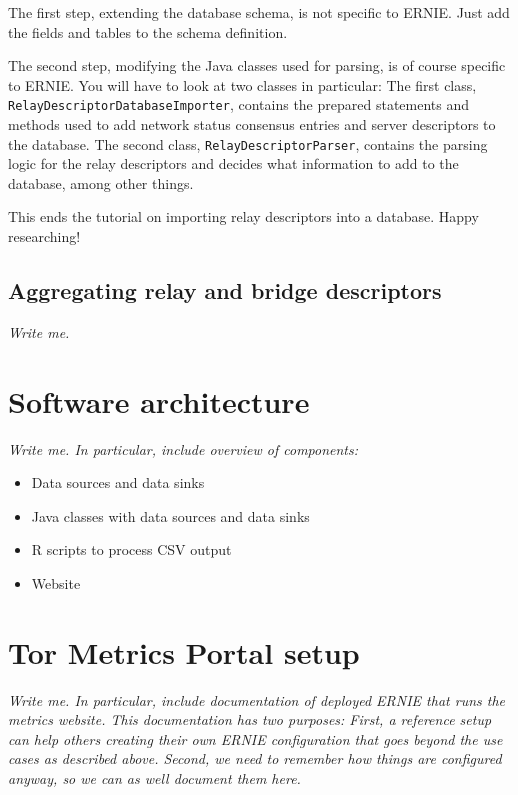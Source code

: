 \documentclass{article}
\begin{document}
The first step, extending the database schema, is not specific to ERNIE.
Just add the fields and tables to the schema definition.

The second step, modifying the Java classes used for parsing, is of course
specific to ERNIE.
You will have to look at two classes in particular:
The first class, \verb+RelayDescriptorDatabaseImporter+, contains the
prepared statements and methods used to add network status consensus
entries and server descriptors to the database.
The second class, \verb+RelayDescriptorParser+, contains the parsing logic
for the relay descriptors and decides what information to add to the
database, among other things.

This ends the tutorial on importing relay descriptors into a database.
Happy researching!

\subsection{Aggregating relay and bridge descriptors}

{\it Write me.}

\section{Software architecture}

{\it Write me. In particular, include overview of components:

\begin{itemize}
\item Data sources and data sinks
\item Java classes with data sources and data sinks
\item R scripts to process CSV output
\item Website
\end{itemize}
}

\section{Tor Metrics Portal setup}

{\it
Write me. In particular, include documentation of deployed ERNIE that
runs the metrics website.
This documentation has two purposes:
First, a reference setup can help others creating their own ERNIE
configuration that goes beyond the use cases as described above.
Second, we need to remember how things are configured anyway, so we can
as well document them here.}
\end{document}

